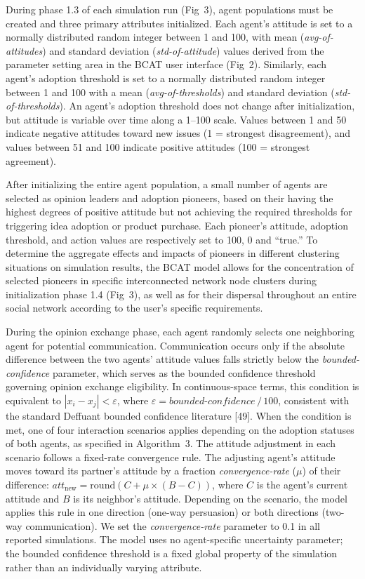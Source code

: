 \documentclass[10pt,letterpaper]{article}
\begin{document}
During phase 1.3 of each simulation run (Fig~3), agent populations must be created and three primary attributes initialized. Each agent's attitude is set to a normally distributed random integer between 1 and 100, with mean (\textit{avg-of-attitudes}) and standard deviation (\textit{std-of-attitude}) values derived from the parameter setting area in the BCAT user interface (Fig~2). Similarly, each agent's adoption threshold is set to a normally distributed random integer between 1 and 100 with a mean (\textit{avg-of-thresholds}) and standard deviation (\textit{std-of-thresholds}). An agent's adoption threshold does not change after initialization, but attitude is variable over time along a 1--100 scale. Values between 1 and 50 indicate negative attitudes toward new issues (1 = strongest disagreement), and values between 51 and 100 indicate positive attitudes (100 = strongest agreement).

After initializing the entire agent population, a small number of agents are selected as opinion leaders and adoption pioneers, based on their having the highest degrees of positive attitude but not achieving the required thresholds for triggering idea adoption or product purchase. Each pioneer's attitude, adoption threshold, and action values are respectively set to 100, 0 and ``true.'' To determine the aggregate effects and impacts of pioneers in different clustering situations on simulation results, the BCAT model allows for the concentration of selected pioneers in specific interconnected network node clusters during initialization phase 1.4 (Fig~3), as well as for their dispersal throughout an entire social network according to the user's specific requirements.

During the opinion exchange phase, each agent randomly selects one neighboring agent for potential communication. Communication occurs only if the absolute difference between the two agents' attitude values falls strictly below the \textit{bounded-confidence} parameter, which serves as the bounded confidence threshold governing opinion exchange eligibility. In continuous-space terms, this condition is equivalent to $|x_i - x_j| < \varepsilon$, where $\varepsilon = \textit{bounded-confidence}\,/\,100$, consistent with the standard Deffuant bounded confidence literature [49]. When the condition is met, one of four interaction scenarios applies depending on the adoption statuses of both agents, as specified in Algorithm~3. The attitude adjustment in each scenario follows a fixed-rate convergence rule. The adjusting agent's attitude moves toward its partner's attitude by a fraction \textit{convergence-rate} ($\mu$) of their difference: $\textit{att}_{\text{new}} = \text{round}(C + \mu \times (B - C))$, where $C$ is the agent's current attitude and $B$ is its neighbor's attitude. Depending on the scenario, the model applies this rule in one direction (one-way persuasion) or both directions (two-way communication). We set the \textit{convergence-rate} parameter to 0.1 in all reported simulations. The model uses no agent-specific uncertainty parameter; the bounded confidence threshold is a fixed global property of the simulation rather than an individually varying attribute.
\end{document}
